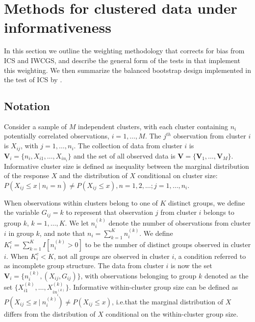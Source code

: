 \section{Methods for clustered data under informativeness} \label{s:methods}

In this section we outline the weighting methodology that corrects for bias from ICS and IWCGS, and describe the general form of the tests in  that implement this weighting. We then summarize the balanced bootstrap design implemented in the test of ICS by \citet{nevalainen17}. 

\subsection{Notation}
Consider a sample of $M$ independent clusters, with each cluster containing $n_{i}$ potentially correlated observations, $i=1,\ldots,M$. The $j^{th}$ observation from cluster $i$ is $X_{ij}$, with $j=1,\ldots,n_{i}$. The collection of data from cluster $i$ is $\bm{V}_{i} = \{n_{i}, X_{i1}, \ldots, X_{in_{i}}\}$ and the set of all observed data is $\bm{V}=\{\bm{V}_{1}, \ldots, \bm{V}_{M} \}$. Informative cluster size is defined as inequality between the marginal distribution of the response $X$ and the distribution of $X$ conditional on cluster size: $P(X_{ij}\leq x ~|~ n_{i}=n) \neq P(X_{ij} \leq x), n=1,2,\ldots; j = 1,\ldots,n_{i}$. 

When observations within clusters belong to one of $K$ distinct groups, we define the variable $G_{ij}=k$ to represent that observation $j$ from cluster $i$ belongs to group $k$, $k=1,\ldots,K$. We let $n_{i}^{(k)}$ denote the number of observations from cluster $i$ in group $k$, and note that $n_{i}=\sum_{k=1}^{K} n_{i}^{(k)}$. We define $K_{i}^{c}=\sum_{k=1}^{K}I[n_{i}^{(k)}>0]$ to be the number of distinct groups observed in cluster $i$. When $K_i^c < K$, not all groups are observed in cluster $i$, a condition referred to as incomplete group structure. The data from cluster $i$ is now the set $\bm{V}_i=\{n_i^{(k)}, (X_{ij}, G_{ij})\}$, with observations belonging to group $k$ denoted as the set $\{ X_{i1}^{(k)},\ldots,X_{in_{i}^{(k)}}^{(k)} \}$. Informative within-cluster group size can be defined as $P\left(X_{ij}\leq x ~|~ n_{i}^{(k)}\right) \ne P\left(X_{ij}\leq x \right)$, i.e.\@ that the marginal distribution of $X$ differs from the distribution of $X$ conditional on the within-cluster group size.

